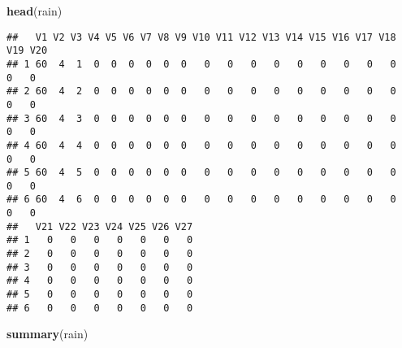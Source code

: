 \documentclass[]{article}
\newenvironment{Shaded}{\begin{snugshade}}{\end{snugshade}}
\newcommand{\KeywordTok}[1]{\textcolor[rgb]{0.13,0.29,0.53}{\textbf{#1}}}
\newcommand{\NormalTok}[1]{#1}
\begin{document}
\begin{Shaded}
\begin{Highlighting}[]
\KeywordTok{head}\NormalTok{(rain)}
\end{Highlighting}
\end{Shaded}

\begin{verbatim}
##   V1 V2 V3 V4 V5 V6 V7 V8 V9 V10 V11 V12 V13 V14 V15 V16 V17 V18 V19 V20
## 1 60  4  1  0  0  0  0  0  0   0   0   0   0   0   0   0   0   0   0   0
## 2 60  4  2  0  0  0  0  0  0   0   0   0   0   0   0   0   0   0   0   0
## 3 60  4  3  0  0  0  0  0  0   0   0   0   0   0   0   0   0   0   0   0
## 4 60  4  4  0  0  0  0  0  0   0   0   0   0   0   0   0   0   0   0   0
## 5 60  4  5  0  0  0  0  0  0   0   0   0   0   0   0   0   0   0   0   0
## 6 60  4  6  0  0  0  0  0  0   0   0   0   0   0   0   0   0   0   0   0
##   V21 V22 V23 V24 V25 V26 V27
## 1   0   0   0   0   0   0   0
## 2   0   0   0   0   0   0   0
## 3   0   0   0   0   0   0   0
## 4   0   0   0   0   0   0   0
## 5   0   0   0   0   0   0   0
## 6   0   0   0   0   0   0   0
\end{verbatim}

\begin{Shaded}
\begin{Highlighting}[]
\KeywordTok{summary}\NormalTok{(rain)}
\end{Highlighting}
\end{Shaded}
\end{document}
